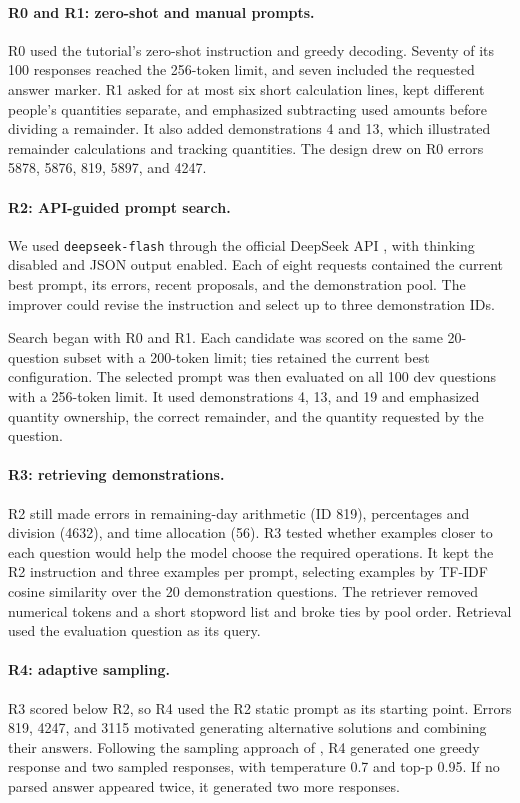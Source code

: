 \documentclass{article}
\begin{document}
\paragraph{R0 and R1: zero-shot and manual prompts.}
R0 used the tutorial's zero-shot instruction and greedy decoding.
Seventy of its 100 responses reached the 256-token limit, and seven included
the requested answer marker. R1 asked for at most six short calculation lines,
kept different people's quantities separate, and emphasized subtracting used
amounts before dividing a remainder. It also added demonstrations 4 and 13,
which illustrated remainder calculations and tracking quantities.
The design drew on R0 errors 5878, 5876, 819, 5897, and 4247.

\newpage
\paragraph{R2: API-guided prompt search.}
We used \texttt{deepseek-flash} through the official DeepSeek API \citep{deepseek},
with thinking disabled and JSON output enabled. Each of eight requests
contained the current best prompt, its errors, recent proposals, and the
demonstration pool. The improver could revise the instruction and select up
to three demonstration IDs.

Search began with R0 and R1. Each candidate was scored on the same
20-question subset with a 200-token limit; ties retained the current best
configuration. The selected prompt was then evaluated on all 100 dev
questions with a 256-token limit. It used demonstrations 4, 13, and 19 and
emphasized quantity ownership, the correct remainder, and the quantity
requested by the question.

\paragraph{R3: retrieving demonstrations.}
R2 still made errors in remaining-day arithmetic (ID 819), percentages and
division (4632), and time allocation (56). R3 tested whether examples closer
to each question would help the model choose the required operations.
It kept the R2 instruction and three examples per prompt, selecting examples
by TF-IDF cosine similarity over the 20 demonstration questions.
The retriever removed numerical tokens and a short stopword list and broke
ties by pool order. Retrieval used the evaluation question as its query.

\paragraph{R4: adaptive sampling.}
R3 scored below R2, so R4 used the R2 static prompt as its starting point.
Errors 819, 4247, and 3115 motivated generating alternative solutions and
combining their answers. Following the sampling approach of \citet{wang},
R4 generated one greedy response and two sampled responses, with
temperature 0.7 and top-p 0.95. If no parsed answer appeared twice, it
generated two more responses.
\end{document}
